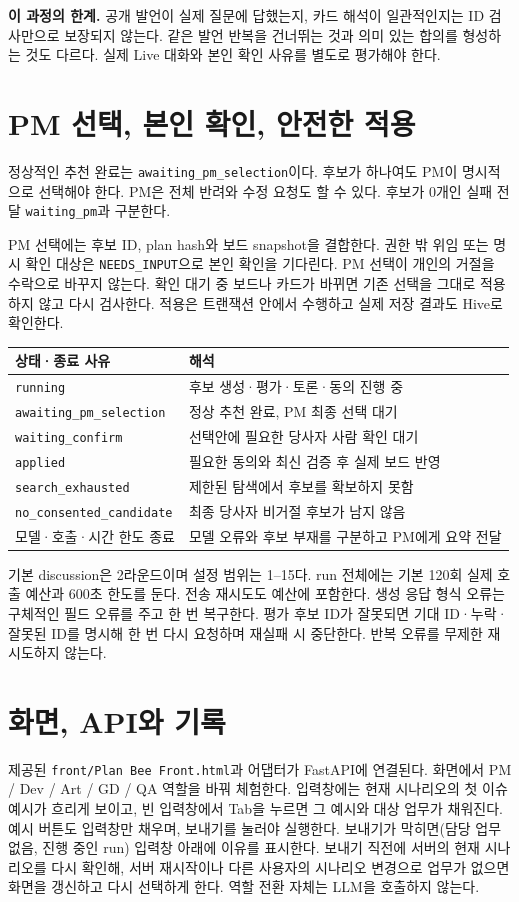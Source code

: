 \documentclass[11pt,a4paper]{article}
\begin{document}
\textbf{이 과정의 한계.} 공개 발언이 실제 질문에 답했는지, 카드 해석이 일관적인지는 ID 검사만으로 보장되지 않는다. 같은 발언 반복을 건너뛰는 것과 의미 있는 합의를 형성하는 것도 다르다. 실제 Live 대화와 본인 확인 사유를 별도로 평가해야 한다.

\newpage
\section{PM 선택, 본인 확인, 안전한 적용}
정상적인 추천 완료는 \texttt{awaiting\_pm\_selection}이다. 후보가 하나여도 PM이 명시적으로 선택해야 한다. PM은 전체 반려와 수정 요청도 할 수 있다. 후보가 0개인 실패 전달 \texttt{waiting\_pm}과 구분한다.

PM 선택에는 후보 ID, plan hash와 보드 snapshot을 결합한다. 권한 밖 위임 또는 명시 확인 대상은 \texttt{NEEDS\_INPUT}으로 본인 확인을 기다린다. PM 선택이 개인의 거절을 수락으로 바꾸지 않는다. 확인 대기 중 보드나 카드가 바뀌면 기존 선택을 그대로 적용하지 않고 다시 검사한다. 적용은 트랜잭션 안에서 수행하고 실제 저장 결과도 Hive로 확인한다.

\begin{tabularx}{\linewidth}{@{}p{46mm}Y@{}}\toprule
상태·종료 사유 & 해석\\\midrule
\texttt{running} & 후보 생성·평가·토론·동의 진행 중\\
\texttt{awaiting\_pm\_selection} & 정상 추천 완료, PM 최종 선택 대기\\
\texttt{waiting\_confirm} & 선택안에 필요한 당사자 사람 확인 대기\\
\texttt{applied} & 필요한 동의와 최신 검증 후 실제 보드 반영\\
\texttt{search\_exhausted} & 제한된 탐색에서 후보를 확보하지 못함\\
\texttt{no\_consented\_candidate} & 최종 당사자 비거절 후보가 남지 않음\\
모델·호출·시간 한도 종료 & 모델 오류와 후보 부재를 구분하고 PM에게 요약 전달\\\bottomrule
\end{tabularx}

기본 discussion은 2라운드이며 설정 범위는 1--15다. run 전체에는 기본 120회 실제 호출 예산과 600초 한도를 둔다. 전송 재시도도 예산에 포함한다. 생성 응답 형식 오류는 구체적인 필드 오류를 주고 한 번 복구한다. 평가 후보 ID가 잘못되면 기대 ID·누락·잘못된 ID를 명시해 한 번 다시 요청하며 재실패 시 중단한다. 반복 오류를 무제한 재시도하지 않는다.

\section{화면, API와 기록}
제공된 \texttt{front/Plan Bee Front.html}과 어댑터가 FastAPI에 연결된다. 화면에서 PM / Dev / Art / GD / QA 역할을 바꿔 체험한다. 입력창에는 현재 시나리오의 첫 이슈 예시가 흐리게 보이고, 빈 입력창에서 Tab을 누르면 그 예시와 대상 업무가 채워진다. 예시 버튼도 입력창만 채우며, 보내기를 눌러야 실행한다. 보내기가 막히면(담당 업무 없음, 진행 중인 run) 입력창 아래에 이유를 표시한다. 보내기 직전에 서버의 현재 시나리오를 다시 확인해, 서버 재시작이나 다른 사용자의 시나리오 변경으로 업무가 없으면 화면을 갱신하고 다시 선택하게 한다. 역할 전환 자체는 LLM을 호출하지 않는다.
\end{document}

